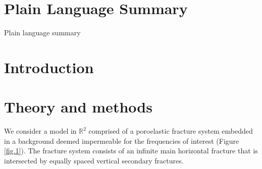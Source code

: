 \documentclass[draft]{agujournal2019}
\begin{document}
\section*{Plain Language Summary}
Plain language summary


%
%

%


%
%
%
%


\section{Introduction}

\section{Theory and methods}
We consider a model in $\mathbb R^2$ comprised of a poroelastic fracture system embedded in a  background deemed impermeable for the frequencies of interest (Figure \ref{fig.1}). The fracture system consists of an infinite main horizontal fracture that is intersected by equally spaced vertical secondary fractures.
\end{document}
